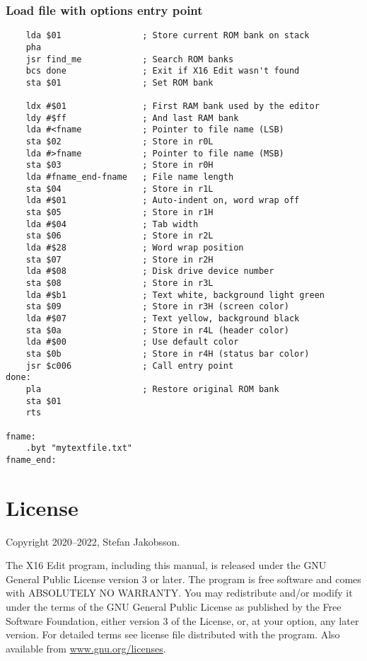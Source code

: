 \documentclass{article}
\begin{document}
    \subsubsection{Load file with options entry point}
\begin{verbatim}
    lda $01                ; Store current ROM bank on stack
    pha
    jsr find_me            ; Search ROM banks
    bcs done               ; Exit if X16 Edit wasn't found
    sta $01                ; Set ROM bank
    
    ldx #$01               ; First RAM bank used by the editor
    ldy #$ff               ; And last RAM bank
    lda #<fname            ; Pointer to file name (LSB)
    sta $02                ; Store in r0L
    lda #>fname            ; Pointer to file name (MSB)
    sta $03                ; Store in r0H
    lda #fname_end-fname   ; File name length
    sta $04                ; Store in r1L
    lda #$01               ; Auto-indent on, word wrap off
    sta $05                ; Store in r1H
    lda #$04               ; Tab width
    sta $06                ; Store in r2L
    lda #$28               ; Word wrap position
    sta $07                ; Store in r2H
    lda #$08               ; Disk drive device number
    sta $08                ; Store in r3L
    lda #$b1               ; Text white, background light green
    sta $09                ; Store in r3H (screen color)
    lda #$07               ; Text yellow, background black
    sta $0a                ; Store in r4L (header color)
    lda #$00               ; Use default color
    sta $0b                ; Store in r4H (status bar color)
    jsr $c006              ; Call entry point
done:
    pla                    ; Restore original ROM bank
    sta $01
    rts
   
fname:
    .byt "mytextfile.txt"
fname_end:
\end{verbatim}

\section{License}
	Copyright 2020--2022, Stefan Jakobsson.

	The X16 Edit program, including this manual, is released under the GNU General Public License version 3 or later.
    The program is free software and comes with ABSOLUTELY NO WARRANTY. You may redistribute and/or modify it under the 
    terms of the GNU General Public License as pub­lished by the Free Software Foundation, either version 3 of the License, 
    or, at your option, any later version. For detailed terms see license file distributed with the program. 
    Also available from \href{https://www.gnu.org/licenses}{www.gnu.org/licenses}.
\end{document}
